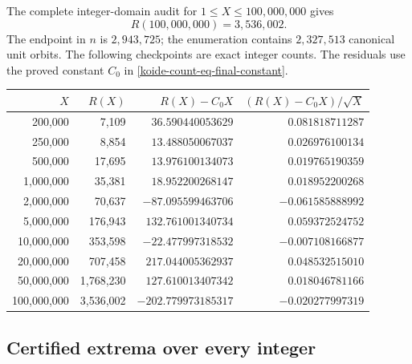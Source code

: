 The complete integer-domain audit for
\(1\leq X\leq100{,}000{,}000\) gives
\begin{equation}
 \boxed{R(100{,}000{,}000)=3{,}536{,}002.}
 \label{koide-count-eq-census-final-count}
\end{equation}
The endpoint in \(n\) is \(2{,}943{,}725\); the enumeration contains
\(2{,}327{,}513\) canonical unit orbits.  The following checkpoints are
exact integer counts.  The residuals use the proved constant
\(C_0\) in \eqref{koide-count-eq-final-constant}.
\begin{center}
\begin{tabular}{r@{\qquad}r@{\qquad}r@{\qquad}r}
\toprule
\(X\)&\(R(X)\)&\(R(X)-C_0X\)&\((R(X)-C_0X)/\sqrt X\)\\
\midrule
200,000&7,109&\(36.590440053629\)&\(0.081818711287\)\\
250,000&8,854&\(13.488050067037\)&\(0.026976100134\)\\
500,000&17,695&\(13.976100134073\)&\(0.019765190359\)\\
1,000,000&35,381&\(18.952200268147\)&\(0.018952200268\)\\
2,000,000&70,637&\(-87.095599463706\)&\(-0.061585888992\)\\
5,000,000&176,943&\(132.761001340734\)&\(0.059372524752\)\\
10,000,000&353,598&\(-22.477997318532\)&\(-0.007108166877\)\\
20,000,000&707,458&\(217.044005362937\)&\(0.048532515010\)\\
50,000,000&1,768,230&\(127.610013407342\)&\(0.018046781166\)\\
100,000,000&3,536,002&\(-202.779973185317\)&\(-0.020277997319\)\\
\bottomrule
\end{tabular}
\end{center}

\subsection{Certified extrema over every integer}

